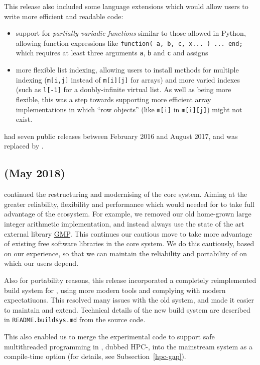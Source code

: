 \documentclass{deliverablereport}
\begin{document}
This release also included some language extensions which would allow users to write
more efficient and readable code:
\begin{itemize}
  \item support for \emph{partially
  variadic functions} similar to those allowed in Python, allowing
function expressions like
\verb|function( a, b, c, x... ) ... end;|
which requires at least three arguments \verb|a|, \verb|b| and
\verb|c| and assigns
\item more flexible list indexing, allowing users to install methods
  for multiple indexing   (\verb|m[i,j]| instead of \verb|m[i][j]| for arrays) and more varied
  indexes (such as \verb|l[-1]| for a doubly-infinite virtual list. As
  well as being more flexible, this was a step towards supporting more
  efficient array implementations  in which ``row objects'' (like
  \verb|m[i]| in \verb|m[i][j]|) might not exist.
\end{itemize}

 had seven public releases between February 2016 and August 2017, and
was replaced by .

\subsection{ (May 2018)}\label{gap-4.9}

 continued the restructuring and modernising of the core \GAP
system. Aiming at the greater reliability, flexibility and performance
which would needed for \GAP to take full advantage of the \ODK ecosystem.
For example, we removed our old home-grown large integer arithmetic
implementation, and instead always 
use the state of the art external library \href{???}{GMP}. This
continues our cautious move to take more advantage of existing free
software libraries in the core system. We do this cautiously, based on
our experience,  so that we can maintain the reliability and
portability of \GAP on which our users depend.

Also for portability reasons, this release incorporated a  completely
reimplemented build system for \GAP, using more modern tools and
complying with modern expectatiuons. This resolved many issues with the old
system, and made it easier to maintain and extend. Technical details
of the new build system are described in {\tt README.buildsys.md} from
the \GAP source code. 

This also enabled us to merge the experimental code to support safe multithreaded programming in \GAP, 
dubbed HPC-\GAP, into the mainstream \GAP system as a compile-time option (for details, see
Subsection~\ref{hpc-gap}).
\end{document}
